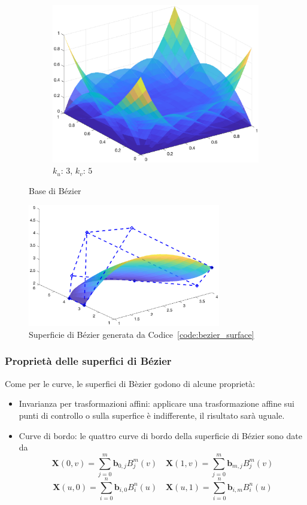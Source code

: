 \documentclass[a4paper, 12pt]{article}
\begin{document}
\begin{figure}[]
\begin{subfigure}[b]{0.3\textwidth}
      \includegraphics[width=\textwidth]{figure/bezier_surface_basis35_1.eps}
      \caption{$k_u$: $3$, $k_v$: $5$}
      \label{fig:bezier_surface_basis35_1}
  \end{subfigure}
  \caption{Base di Bézier}\label{fig:bezier_basis}
\end{figure}
\begin{figure}[]
  \centering
  \includegraphics[width=0.75\textwidth]{figure/bezier_surface1.eps}
  \caption{Superficie di Bézier generata da Codice~\ref{code:bezier_surface}}
  \label{fig:bezier_sup_code}
\end{figure} 
\subsubsection{Proprietà delle superfici di Bézier}
Come per le curve, le superfici di Bèzier godono di alcune proprietà:
\begin{itemize}
  \item Invarianza per trasformazioni affini: applicare una trasformazione affine sui punti di controllo o sulla superfice è indifferente, il risultato sarà uguale.
  \item Curve di bordo: le quattro curve di bordo della superficie di Bézier sono date da
  $$\mathbf{X}(0,v) = \sum_{j=0}^{m} \mathbf{b}_{0,j}B_{j}^{m}(v) \quad \mathbf{X}(1,v) = \sum_{j=0}^{m} \mathbf{b}_{m,j}B_{j}^{m}(v)$$
  $$\mathbf{X}(u, 0) = \sum_{i=0}^{n} \mathbf{b}_{i,0}B_{i}^{n}(u) \quad \mathbf{X}(u,1) = \sum_{i=0}^{n} \mathbf{b}_{i, m}B_{i}^{n}(u)$$
\end{itemize}
\end{document}
